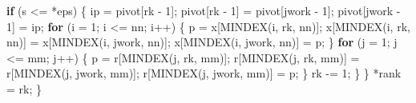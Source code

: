 \documentclass[
  12pt,
  letterpaper,
  DIV=11,
  numbers=noendperiod]{scrreprt}
\newenvironment{Shaded}{\begin{snugshade}}{\end{snugshade}}
\newcommand{\ControlFlowTok}[1]{\textcolor[rgb]{0.00,0.23,0.31}{\textbf{#1}}}
\newcommand{\DecValTok}[1]{\textcolor[rgb]{0.68,0.00,0.00}{#1}}
\newcommand{\NormalTok}[1]{\textcolor[rgb]{0.00,0.23,0.31}{#1}}
\newcommand{\OperatorTok}[1]{\textcolor[rgb]{0.37,0.37,0.37}{#1}}
\theoremstyle{remark}
\begin{document}
\begin{Shaded}
\begin{Highlighting}[]
        \ControlFlowTok{if} \OperatorTok{(}\NormalTok{s }\OperatorTok{\textless{}=} \OperatorTok{*}\NormalTok{eps}\OperatorTok{)} \OperatorTok{\{}
\NormalTok{            ip }\OperatorTok{=}\NormalTok{ pivot}\OperatorTok{[}\NormalTok{rk }\OperatorTok{{-}} \DecValTok{1}\OperatorTok{];}
\NormalTok{            pivot}\OperatorTok{[}\NormalTok{rk }\OperatorTok{{-}} \DecValTok{1}\OperatorTok{]} \OperatorTok{=}\NormalTok{ pivot}\OperatorTok{[}\NormalTok{jwork }\OperatorTok{{-}} \DecValTok{1}\OperatorTok{];}
\NormalTok{            pivot}\OperatorTok{[}\NormalTok{jwork }\OperatorTok{{-}} \DecValTok{1}\OperatorTok{]} \OperatorTok{=}\NormalTok{ ip}\OperatorTok{;}
            \ControlFlowTok{for} \OperatorTok{(}\NormalTok{i }\OperatorTok{=} \DecValTok{1}\OperatorTok{;}\NormalTok{ i }\OperatorTok{\textless{}=}\NormalTok{ nn}\OperatorTok{;}\NormalTok{ i}\OperatorTok{++)} \OperatorTok{\{}
\NormalTok{                p }\OperatorTok{=}\NormalTok{ x}\OperatorTok{[}\NormalTok{MINDEX}\OperatorTok{(}\NormalTok{i}\OperatorTok{,}\NormalTok{ rk}\OperatorTok{,}\NormalTok{ nn}\OperatorTok{)];}
\NormalTok{                x}\OperatorTok{[}\NormalTok{MINDEX}\OperatorTok{(}\NormalTok{i}\OperatorTok{,}\NormalTok{ rk}\OperatorTok{,}\NormalTok{ nn}\OperatorTok{)]} \OperatorTok{=}\NormalTok{ x}\OperatorTok{[}\NormalTok{MINDEX}\OperatorTok{(}\NormalTok{i}\OperatorTok{,}\NormalTok{ jwork}\OperatorTok{,}\NormalTok{ nn}\OperatorTok{)];}
\NormalTok{                x}\OperatorTok{[}\NormalTok{MINDEX}\OperatorTok{(}\NormalTok{i}\OperatorTok{,}\NormalTok{ jwork}\OperatorTok{,}\NormalTok{ nn}\OperatorTok{)]} \OperatorTok{=}\NormalTok{ p}\OperatorTok{;}
            \OperatorTok{\}}
            \ControlFlowTok{for} \OperatorTok{(}\NormalTok{j }\OperatorTok{=} \DecValTok{1}\OperatorTok{;}\NormalTok{ j }\OperatorTok{\textless{}=}\NormalTok{ mm}\OperatorTok{;}\NormalTok{ j}\OperatorTok{++)} \OperatorTok{\{}
\NormalTok{                p }\OperatorTok{=}\NormalTok{ r}\OperatorTok{[}\NormalTok{MINDEX}\OperatorTok{(}\NormalTok{j}\OperatorTok{,}\NormalTok{ rk}\OperatorTok{,}\NormalTok{ mm}\OperatorTok{)];}
\NormalTok{                r}\OperatorTok{[}\NormalTok{MINDEX}\OperatorTok{(}\NormalTok{j}\OperatorTok{,}\NormalTok{ rk}\OperatorTok{,}\NormalTok{ mm}\OperatorTok{)]} \OperatorTok{=}\NormalTok{ r}\OperatorTok{[}\NormalTok{MINDEX}\OperatorTok{(}\NormalTok{j}\OperatorTok{,}\NormalTok{ jwork}\OperatorTok{,}\NormalTok{ mm}\OperatorTok{)];}
\NormalTok{                r}\OperatorTok{[}\NormalTok{MINDEX}\OperatorTok{(}\NormalTok{j}\OperatorTok{,}\NormalTok{ jwork}\OperatorTok{,}\NormalTok{ mm}\OperatorTok{)]} \OperatorTok{=}\NormalTok{ p}\OperatorTok{;}
            \OperatorTok{\}}
\NormalTok{            rk }\OperatorTok{{-}=} \DecValTok{1}\OperatorTok{;}
        \OperatorTok{\}}
    \OperatorTok{\}}
    \OperatorTok{*}\NormalTok{rank }\OperatorTok{=}\NormalTok{ rk}\OperatorTok{;}
\OperatorTok{\}}
\end{Highlighting}
\end{Shaded}
\end{document}
